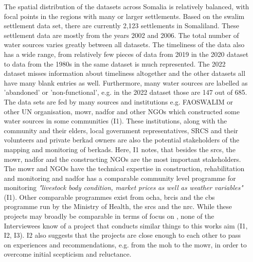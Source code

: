 The spatial distribution of the datasets across Somalia is relatively balanced, with focal points in the regions with many or larger settlements. Based on the \acrshort{swalim} settlement data set, there are currently 2,123 settlements in Somaliland. These settlement data are mostly from the years 2002 and 2006. The total number of water sources varies greatly between all datasets. The timeliness of the data also has a wide range, from relatively few pieces of data from 2019 in the 2020 dataset to data from the 1980s in the same dataset is much represented. The 2022 dataset misses information about timeliness altogether and the other datasets all have many blank entries as well. Furthermore, many water sources are labelled as 'abandoned' or 'non-functional', e.g. in the 2022 dataset those are 147 out of 685.\newline
The data sets are fed by many sources and institutions e.g. FAOSWALIM or other UN organisation, \acrshort{mowr}, \acrshort{nadfor} and other NGOs which constructed some water sources in some communities (I1). These institutions, along with the community and their elders, local government representatives, SRCS and their volunteers and private berkad owners are also the potential stakeholders of the mapping and monitoring of berkads. Here, I1 notes, that besides the \acrshort{srcs}, the \acrshort{mowr}, \acrshort{nadfor} and the constructing NGOs are the most important stakeholders. The \acrshort{mowr} and NGOs have the technical expertise in construction, rehabilitation and monitoring and \acrshort{nadfor} has a comparable community level programme for monitoring \textit{"livestock body condition, market prices as well as weather variables"} (I1).\newline
Other comparable programmes exist from \acrshort{ocha}, \acrshort{brcis} and the \acrshort{cbs} programme run by the Ministry of Health, the \acrshort{srcs} and the \acrshort{nrc}. While these projects may broadly be comparable in terms of focus on , none of the Interviewees know of a project that conducts similar things to this works aim (I1, I2, I3). I2 also suggests that the projects are close enough to each other to pass on experiences and recommendations, e.g. from the \acrshort{moh} to the \acrshort{mowr}, in order to overcome initial scepticism and reluctance.\newline
